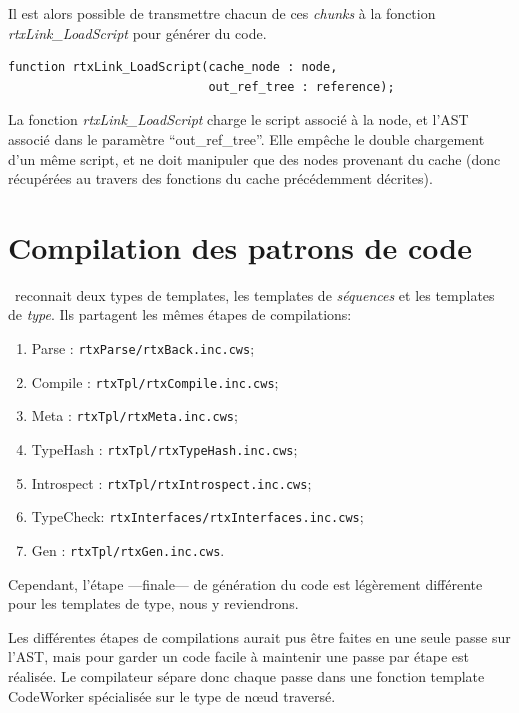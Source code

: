 \documentclass[french]{rtxreport}
\begin{document}
Il est alors possible de transmettre chacun de ces \emph{chunks} à la fonction
\emph{rtxLink\_LoadScript} pour générer du code.


\begin{lstlisting}
function rtxLink_LoadScript(cache_node : node,
                            out_ref_tree : reference);
\end{lstlisting}
La fonction \emph{rtxLink\_LoadScript} charge le script associé à la node, et
l'AST associé dans le paramètre ``out\_ref\_tree''. Elle empêche le
double chargement d'un même script, et ne doit manipuler que des nodes
provenant du cache (donc récupérées au travers des fonctions du cache
précédemment décrites).





\section{Compilation des patrons de code}

\rtx\ reconnait deux types de templates, les templates de \emph{séquences} et
les templates de \emph{type}. Ils partagent les mêmes étapes de compilations:
\begin{enumerate}
    \item Parse : \texttt{rtxParse/rtxBack.inc.cws};
    \item Compile : \texttt{rtxTpl/rtxCompile.inc.cws};
    \item Meta : \texttt{rtxTpl/rtxMeta.inc.cws};
    \item TypeHash : \texttt{rtxTpl/rtxTypeHash.inc.cws};
    \item Introspect : \texttt{rtxTpl/rtxIntrospect.inc.cws};
    \item TypeCheck: \texttt{rtxInterfaces/rtxInterfaces.inc.cws};
    \item Gen : \texttt{rtxTpl/rtxGen.inc.cws}.
\end{enumerate}
Cependant, l'étape ---finale--- de génération du code est légèrement différente
pour les templates de type, nous y reviendrons.

Les différentes étapes de compilations aurait pus être faites en une seule passe
sur l'AST, mais pour garder un code facile à maintenir une passe par étape est
réalisée. Le compilateur sépare donc chaque passe dans une fonction template
CodeWorker spécialisée sur le type de nœud traversé. %
\end{document}
